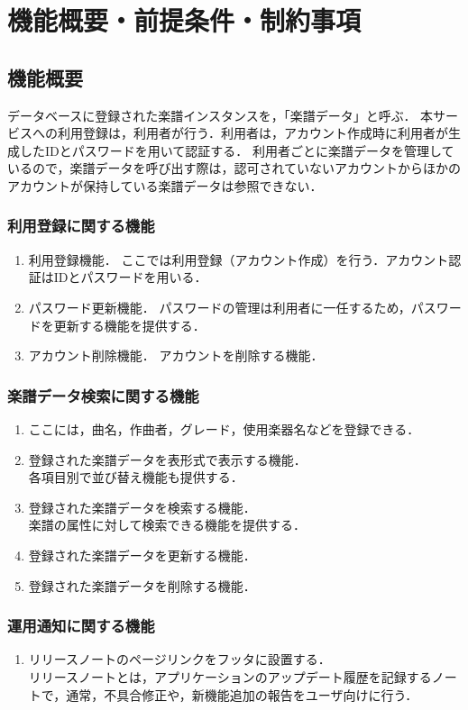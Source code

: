 \chapter{機能概要・前提条件・制約事項}
\section{機能概要}
データベースに登録された楽譜インスタンスを，「楽譜データ」と呼ぶ．
本サービスへの利用登録は，利用者が行う．利用者は，アカウント作成時に利用者が生成したIDとパスワードを用いて認証する．
利用者ごとに楽譜データを管理しているので，楽譜データを呼び出す際は，認可されていないアカウントからほかのアカウントが保持している楽譜データは参照できない．
\subsection{利用登録に関する機能}
\begin{enumerate}
      \item 利用登録機能．
            ここでは利用登録（アカウント作成）を行う．アカウント認証はIDとパスワードを用いる．
      \item パスワード更新機能．
            パスワードの管理は利用者に一任するため，パスワードを更新する機能を提供する．
      \item アカウント削除機能．
            アカウントを削除する機能．
\end{enumerate}
\subsection{楽譜データ検索に関する機能}
\begin{enumerate}
      \item ここには，曲名，作曲者，グレード，使用楽器名などを登録できる．
      \item 登録された楽譜データを表形式で表示する機能．\\
            各項目別で並び替え機能も提供する．
      \item 登録された楽譜データを検索する機能．\\
            楽譜の属性に対して検索できる機能を提供する．
      \item 登録された楽譜データを更新する機能．
      \item 登録された楽譜データを削除する機能．
\end{enumerate}
\subsection{運用通知に関する機能}
\begin{enumerate}
      \item リリースノートのページリンクをフッタに設置する．\\
            リリースノートとは，アプリケーションのアップデート履歴を記録するノートで，通常，不具合修正や，新機能追加の報告をユーザ向けに行う．
\end{enumerate}
